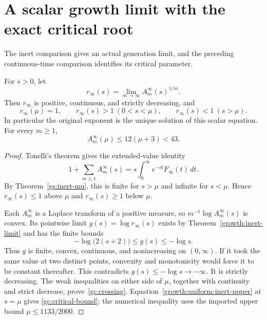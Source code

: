 \section{A scalar growth limit with the exact critical root}
\label{gc:section}

The inert comparison gives an actual generation limit, and the preceding continuous-time comparison identifies its critical parameter.

\begin{theorem}
\label{gc:root}
For $s>0$, let
\[
 r_\infty(s)=\lim_{m\to\infty} A_m^\infty(s)^{1/m}.
\]
Then $r_\infty$ is positive, continuous, and strictly decreasing, and
\begin{equation}\label{gc:crossing}
 \boxed{r_\infty(\mu)=1,\qquad
 r_\infty(s)>1\ (0<s<\mu),\qquad
 r_\infty(s)<1\ (s>\mu).}
\end{equation}
In particular the original exponent is the unique solution of this
scalar equation. For every $m\ge1$,
\begin{equation}\label{gc:critical-bound}
 A_m^\infty(\mu)\le 12(\mu+3)<43.
\end{equation}
\end{theorem}
\begin{proof}
Tonelli's theorem gives the extended-value identity
\[
 1+\sum_{m\ge1}A_m^\infty(s)
 =s\int_0^\infty e^{-st}F_\infty(t)\,dt.
\]
By Theorem~\ref{gs:inert-mu}, this is finite for $s>\mu$ and infinite
for $s<\mu$. Hence $r_\infty(s)\le1$ above $\mu$ and
$r_\infty(s)\ge1$ below $\mu$.

Each $A_m^\infty$ is a Laplace transform of a positive measure, so
$m^{-1}\log A_m^\infty(s)$ is convex. Its pointwise limit
$g(s)=\log r_\infty(s)$ exists by Theorem~\ref{growth:inert-limit}
and has the finite bounds
\[
 -\log\bigl(2(s+2)\bigr)\le g(s)\le-\log s.
\]
Thus $g$ is finite, convex, continuous, and nonincreasing on
$(0,\infty)$. If it took the same value at two distinct points,
convexity and monotonicity would force it to be constant thereafter.
This contradicts $g(s)\le-\log s\to-\infty$. It is strictly decreasing.
The weak inequalities on either side of $\mu$, together with continuity
and strict decrease, prove~\eqref{gc:crossing}.
Equation~\eqref{growth:uniform-inert-upper} at $s=\mu$ gives
\eqref{gc:critical-bound}; the numerical inequality uses the imported
upper bound $\mu\le1133/2000$.
\end{proof}


